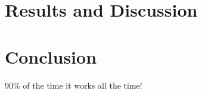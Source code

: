 \documentclass[a4paper,10pt]{article}
\begin{document}



\section{Results and Discussion}
\section{Conclusion}
90\% of the time it works all the time!

 \markright{ }
\end{document}
